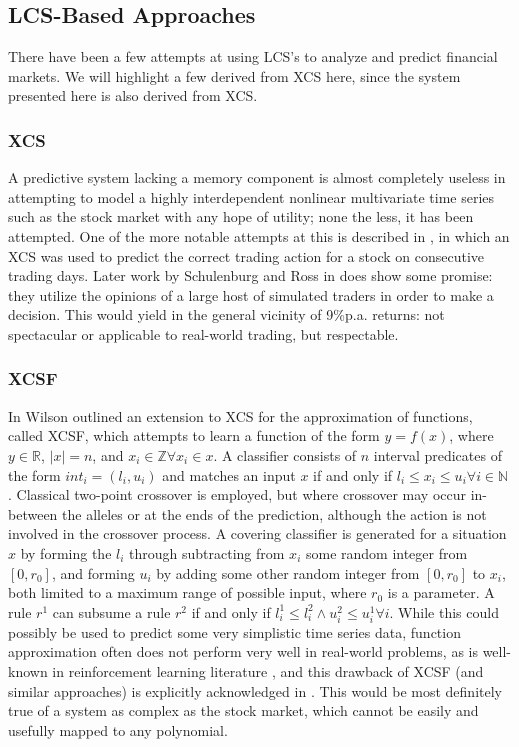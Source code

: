 \subsection{LCS-Based Approaches}
There have been a few attempts at using LCS's to analyze and predict financial markets.
We will highlight a few derived from XCS here, since the system presented here is also derived from XCS.

\subsubsection{XCS}
A predictive system lacking a memory component is almost completely useless in attempting to model a highly interdependent nonlinear multivariate time series such as the stock market with any hope of utility;
none the less, it has been attempted.
One of the more notable attempts at this is described in \cite{SchulenburgRoss:1996:LNAI}, in which an XCS was used to predict the correct trading action for a stock on consecutive trading days.
Later work by Schulenburg and Ross in \cite{SchulenburgRoss:2002:LETS} does show some promise:
they utilize the opinions of a large host of simulated traders in order to make a decision.
This would yield in the general vicinity of 9\%p.a. returns: not spectacular or applicable to real-world trading, but respectable.

\subsubsection{XCSF}
In \cite{Wilson:2001:GECCO} Wilson outlined an extension to XCS for the approximation of functions, called XCSF, which attempts to learn a function of the form $y=f(x)$,
where $y \in \mathbb{R}$, $|x|=n$, and $x_i \in \mathbb{Z} \forall x_i \in x$.
A classifier consists of $n$ interval predicates of the form $int_i = (l_i, u_i)$
and matches an input $x$ if and only if $l_i \le x_i \le u_i \forall i \in \mathbb{N}$. 
Classical two-point crossover is employed, but where crossover may occur in-between the alleles or at the ends of the prediction, although the action is not involved in the crossover process.
A covering classifier is generated for a situation $x$ by forming the $l_i$ through subtracting from $x_i$ some random integer from $[0,r_0]$, and forming $u_i$ by adding some other random integer from $[0,r_0]$ to $x_i$, both limited to a maximum range of possible input, where $r_0$ is a parameter.
A rule $r^1$ can subsume a rule $r^2$ if and only if $l^1_i \le l^2_i \land u^2_i \le u^1_i \forall i$.  
While this could possibly be used to predict some very simplistic time series data, function approximation often does not perform very well in real-world problems, as is well-known in reinforcement learning literature \cite{BoyanMoore:2004,PerkinsPrecup:2002},
and this drawback of XCSF (and similar approaches) is explicitly acknowledged in \cite{LLWG:2005:GECCO}.
This would be most definitely true of a system as complex as the stock market, which cannot be easily and usefully mapped to any polynomial.

